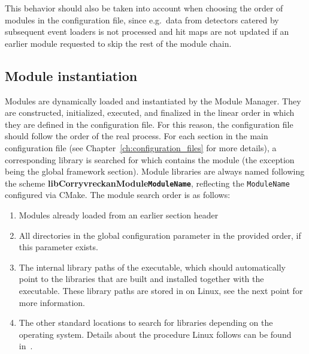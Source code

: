 This behavior should also be taken into account when choosing the order of modules in the configuration file, since e.g.\ data from detectors catered by subsequent event loaders is not processed and hit maps are not updated if an earlier module requested to skip the rest of the module chain.

\subsection{Module instantiation}
\label{sec:module_instantiation}
Modules are dynamically loaded and instantiated by the Module Manager.
They are constructed, initialized, executed, and finalized in the linear order in which they are defined in the configuration file. For this reason, the configuration file should follow the order of the real process.
For each section in the main configuration file (see Chapter~\ref{ch:configuration_files} for more details), a corresponding library is searched for which contains the module (the exception being the global framework section).
Module libraries are always named following the scheme \textbf{libCorryvreckanModule\texttt{ModuleName}}, reflecting the \texttt{ModuleName} configured via CMake.
The module search order is as follows:
\begin{enumerate}
\item Modules already loaded from an earlier section header
\item All directories in the global configuration parameter  in the provided order, if this parameter exists.
\item The internal library paths of the executable, which should automatically point to the libraries that are built and installed together with the executable.
These library paths are stored in  on Linux, see the next point for more information.
\item The other standard locations to search for libraries depending on the operating system.
Details about the procedure Linux follows can be found in~\cite{linuxld}.
\end{enumerate}

